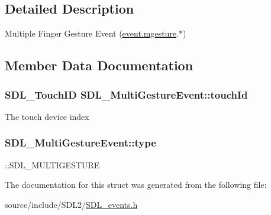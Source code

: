 \subsection{Detailed Description}
Multiple Finger Gesture Event (\hyperlink{union_s_d_l___event_ac19b3c6a6b5181a51eb4fbe2cbe726a9}{event.\+mgesture}.$\ast$) 

\subsection{Member Data Documentation}
\hypertarget{struct_s_d_l___multi_gesture_event_aa15d1201559a3c9277082af71a972dc1}{}
\subsubsection[{touch\+Id}]{\setlength{\rightskip}{0pt plus 5cm}S\+D\+L\+\_\+\+Touch\+I\+D S\+D\+L\+\_\+\+Multi\+Gesture\+Event\+::touch\+Id}\label{struct_s_d_l___multi_gesture_event_aa15d1201559a3c9277082af71a972dc1}
The touch device index \hypertarget{struct_s_d_l___multi_gesture_event_ab0c7adc9a3f71cc3532bfe0ff8cc6120}{}
\subsubsection[{type}]{ S\+D\+L\+\_\+\+Multi\+Gesture\+Event\+::type}\label{struct_s_d_l___multi_gesture_event_ab0c7adc9a3f71cc3532bfe0ff8cc6120}
\+::\+S\+D\+L\+\_\+\+M\+U\+L\+T\+I\+G\+E\+S\+T\+U\+R\+E 

The documentation for this struct was generated from the following file\+:\begin{DoxyCompactItemize}
\item 
source/include/\+S\+D\+L2/\hyperlink{_s_d_l__events_8h}{S\+D\+L\+\_\+events.\+h}\end{DoxyCompactItemize}
